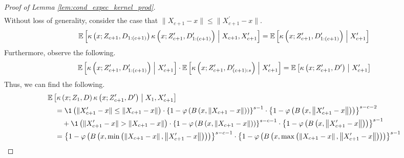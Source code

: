 \begin{proof}[Proof of Lemma \ref{lem:cond_expec_kernel_prod}]
\begin{equation}
\begin{aligned}
		\end{aligned}
	\end{equation}
    Without loss of generality, consider the case that $\|X_{c+1} - x\| \leq \|X_{c+1}^{\prime} - x\|$.
    \begin{equation}
        \mathbb{E}\left[
            \kappa\left(x; Z_{c+1}, D_{1:(c+1)}\right)
            \kappa\left(x; Z_{c+1}^{\prime}, D^{\prime}_{1:(c+1)}\right)
            \; \middle| \; X_{c+1}, X_{c+1}^{\prime}\right] 
        = \mathbb{E}\left[
            \kappa\left(x; Z_{c+1}^{\prime}, D^{\prime}_{1:(c+1)}\right)
            \; \middle| \; X_{c+1}^{\prime}\right]
    \end{equation}
    Furthermore, observe the following.
    \begin{equation}
        \mathbb{E}\left[\kappa\left(x; Z_{c+1}^{\prime}, D^{\prime}_{1:(c+1)}\right) \; \middle| \; X_{c+1}^{\prime}\right]
        \cdot \mathbb{E}\left[\kappa\left(x; Z_{c+1}^{\prime}, D^{\prime}_{(c+1):s}\right)\; \middle| \; X_{c+1}^{\prime} \right]
        = \mathbb{E}\left[\kappa\left(x; Z_{c+1}^{\prime}, D^{\prime}\right)\; \middle| \; X_{c+1}^{\prime} \right]
    \end{equation}
    Thus, we can find the following.
    \begin{equation}
        \begin{aligned}
            & \E\left[\kappa\left(x; Z_{1}, D\right)\kappa\left(x; Z_{c+1}^{\prime}, D^{\prime}\right) \; \middle| \; X_1, X_{c+1}^{\prime}\right]\\
            & \quad = \1\left(\|X_{c+1}^{\prime} - x\| \leq \|X_{c+1} - x\|\right)
            \cdot \left\{1-\varphi\left(B\left(x,\left\|X_{c+1} - x\right\|\right)\right)\right\}^{s-1}
            \cdot \left\{1-\varphi\left(B\left(x,\left\|X_{c+1}^{\prime}-x\right\|\right)\right)\right\}^{s-c-2}\\
            & \quad \quad + \1\left(\|X_{c+1}^{\prime} - x\| > \|X_{c+1} - x\|\right)
            \cdot \left\{1-\varphi\left(B\left(x,\left\|X_{c+1} - x\right\|\right)\right)\right\}^{s-c-1}
            \cdot \left\{1-\varphi\left(B\left(x,\left\|X_{c+1}^{\prime}-x\right\|\right)\right)\right\}^{s-1}\\
            & \quad = \left\{1-\varphi\left(B\left(x, \min\left(\left\|X_{c+1} - x\right\|, \left\|X_{c+1}^{\prime}-x\right\|\right)\right)\right)\right\}^{s-c-1}
            \cdot \left\{1-\varphi\left(B\left(x,\max\left(\left\|X_{c+1} - x\right\|, \left\|X_{c+1}^{\prime}-x\right\|\right)\right)\right)\right\}^{s-1}
        \end{aligned}
    \end{equation}
\end{proof}

